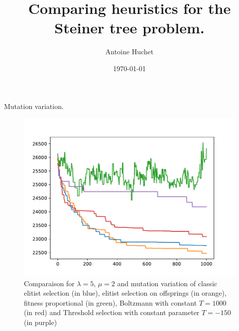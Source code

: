 \documentclass{beamer}
\title{Comparing heuristics for the Steiner tree problem.}
\author{Antoine Huchet}
\date{\today}
\begin{document}
\begin{frame}
\titlepage
\end{frame}

\begin{frame}
	Mutation variation.
\begin{figure}
\centering
\includegraphics[scale=.5]{../Plots/new/5,2,mutation,eofb1000t-150.pdf}
\caption{Comparaison for $\lambda = 5$, $\mu = 2$ and mutation variation of
classic elitist selection (in blue), elitist selection on offsprings (in
orange), fitness proportional (in green), Boltzmann with constant $T = 1000$
(in red) and Threshold selection with constant parameter $T = -150$ (in
purple)}
\label{Mutationcompareselection}
\end{figure}
\end{frame}
\end{document}

